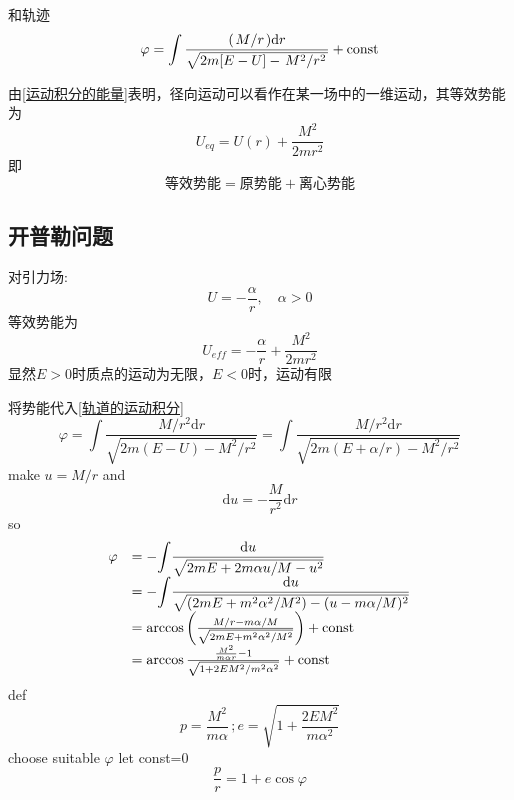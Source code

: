 \documentclass[12pt]{report}
\newcommand{\const}{\mathrm{const}}
\begin{document}
和轨迹
\begin{equation}
    \varphi = \int \frac{(\flatfrac{M}{r})\dd r}{\sqrt{ {2m}[E-U] - \flatfrac{M^2}{r^2}}} +\const
    \label{轨道的运动积分}
\end{equation}

由\ref{运动积分的能量}表明，径向运动可以看作在某一场中的一维运动，其等效势能为
$$ U_{eq} = U(r)+ \frac{M^2}{2mr^2} $$
即
$$\mbox{等效势能}=\mbox{原势能}+\mbox{离心势能}$$

\subsection{开普勒问题}
对引力场:
$$U=- \frac{\alpha}{r} ,\quad \alpha > 0$$
等效势能为
$$U_{eff} = -\frac{\alpha}{r} + \frac{M^2}{2mr^2}$$
显然$E>0$时质点的运动为无限，$E<0$时，运动有限\par
将势能代入\ref{轨道的运动积分}
$$
\varphi=\displaystyle{\int}\frac{M/r^2 \mathrm{d}r}{\sqrt{2m(E-U)-M^2/r^2}}=\displaystyle{\int}\frac{M/r^2 \mathrm{d}r}{\sqrt{2m(E+\alpha/r)-M^2/r^2}}
$$
make $u=M/r$ and
$$\mathrm{d}u=-\frac{M}{r^2}\mathrm{d}r$$ 
so
\begin{equation}
    \begin{array}{rl}
        \varphi&=-\displaystyle{\int} \frac{\mathrm{d}u}{\sqrt{2mE+2m\alpha u/M-u^2}}\\
        &=-\displaystyle{\int} \frac{\mathrm{d}u}{\sqrt{(2mE+m^2\alpha^2/M^2)-(u-m\alpha/M)^2}}\\
        &=\arccos \left(\frac{M/r-m\alpha/M}{\sqrt{2mE+m^2\alpha^2/M^2}}\right)+\rm{const}\\
        &=\arccos \frac{\frac{M^2}{m\alpha r}-1}{\sqrt{1+2EM^2/m^2\alpha^2}}+\rm{const}\\
    \end{array}
\end{equation}
def
$$p=\frac{M^2}{m\alpha}\,;e=\sqrt{1+\frac{2EM^2}{m\alpha^2}}$$
choose suitable $\varphi$ let const=0
$$\frac{p}{r}=1+e\cos\varphi$$
\end{document}
